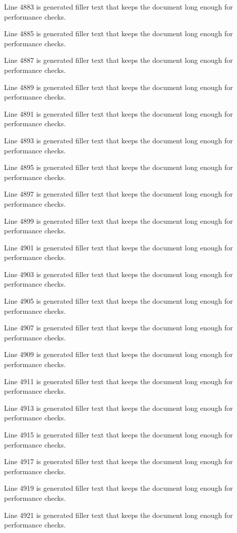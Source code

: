 Line 4883 is generated filler text that keeps the document long enough for performance checks.

Line 4885 is generated filler text that keeps the document long enough for performance checks.

Line 4887 is generated filler text that keeps the document long enough for performance checks.

Line 4889 is generated filler text that keeps the document long enough for performance checks.

Line 4891 is generated filler text that keeps the document long enough for performance checks.

Line 4893 is generated filler text that keeps the document long enough for performance checks.

Line 4895 is generated filler text that keeps the document long enough for performance checks.

Line 4897 is generated filler text that keeps the document long enough for performance checks.

Line 4899 is generated filler text that keeps the document long enough for performance checks.

Line 4901 is generated filler text that keeps the document long enough for performance checks.

Line 4903 is generated filler text that keeps the document long enough for performance checks.

Line 4905 is generated filler text that keeps the document long enough for performance checks.

Line 4907 is generated filler text that keeps the document long enough for performance checks.

Line 4909 is generated filler text that keeps the document long enough for performance checks.

Line 4911 is generated filler text that keeps the document long enough for performance checks.

Line 4913 is generated filler text that keeps the document long enough for performance checks.

Line 4915 is generated filler text that keeps the document long enough for performance checks.

Line 4917 is generated filler text that keeps the document long enough for performance checks.

Line 4919 is generated filler text that keeps the document long enough for performance checks.

Line 4921 is generated filler text that keeps the document long enough for performance checks.

